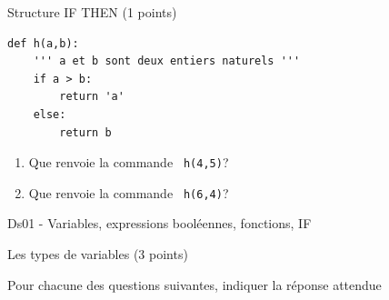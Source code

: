 \documentclass[a4paper,12pt,openany]{book}
\begin{document}
\bigskip

\exo \qquad Structure IF THEN \hfill
(1 points)

\begin{lstlisting}
def h(a,b):
	''' a et b sont deux entiers naturels '''
	if a > b:
		return 'a'
	else:
		return b

\end{lstlisting}

\begin{enumerate}
	\item Que renvoie la commande \verb+ h(4,5)+? \dotfill
	\item Que renvoie la commande \verb+ h(6,4)+? \dotfill

\end{enumerate}


\newpage
\setcounter{nexo}{0}

\begin{center}\begin{large}
Ds01 - Variables, expressions booléennes, fonctions, IF
\end{large}\end{center}

\exo \qquad Les types de variables\hfill
(3 points)

Pour chacune des questions suivantes, indiquer la réponse attendue
\end{document}
